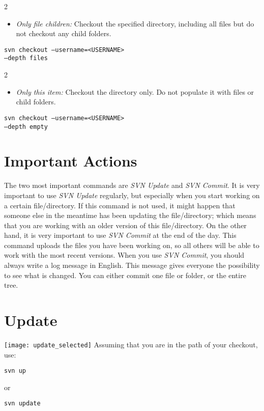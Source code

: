 \begin {multicols}{2}
\begin {itemize}
\item \emph {Only file children:} Checkout the specified directory, including all files but do not checkout any child folders.
\end {itemize}
\columnbreak
\texttt{svn checkout --username=<USERNAME>} \\
\texttt{--depth files } \\
\texttt{\svnUrl{}}
\texttt{\svnDir{}}
\end {multicols}

\begin {multicols}{2}
\begin {itemize}
\item \emph {Only this item:} Checkout the directory only. Do not populate it with files or child folders.
\end {itemize}
\columnbreak
\texttt{svn checkout --username=<USERNAME>} \\
\texttt{--depth empty } \\
\texttt{\svnUrl{}}
\texttt{\svnDir{}}
\end {multicols}

\section{Important Actions}
The two most important commands are \emph{SVN Update} and \emph{SVN Commit}. It is very important to use \emph{SVN Update} regularly, but especially when you start working on a certain file/directory. If this command is not used, it might happen that someone else in the meantime has been updating the file/directory; which means that you are working with an older version of this file/directory. On the other hand, it is very important to use \emph{SVN Commit} at the end of the day. This command uploads the files you have been working on, so all others will be able to work with the most recent versions. When you use \emph{SVN Commit}, you should always write a log message in English. This message gives everyone the possibility to see what is changed. You can either commit one file or folder, or the entire tree. 

\section{Update}
\begin{multicols}{2}
\texttt{[image: update\_selected]}
\columnbreak
\newline Assuming that you are in the path of your checkout, use:
\begin{verbatim}
svn up
\end{verbatim}
or
\begin{verbatim}
svn update
\end{verbatim}
\end{multicols}

